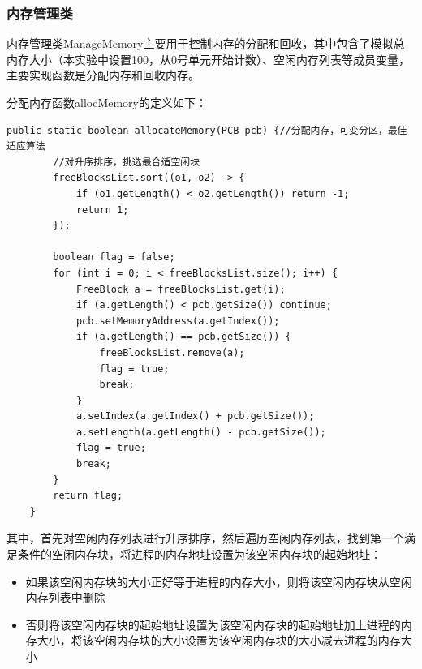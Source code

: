 \documentclass[UTF8,12pt]{article}
\begin{document}
\subsubsection{内存管理类}
内存管理类ManageMemory主要用于控制内存的分配和回收，其中包含了模拟总内存大小（本实验中设置100，从0号单元开始计数）、空闲内存列表等成员变量，主要实现函数是分配内存和回收内存。

分配内存函数allocMemory的定义如下：
\begin{lstlisting}[title=分配内存函数定义,frame=shadowbox]
    public static boolean allocateMemory(PCB pcb) {//分配内存，可变分区，最佳适应算法
        //对升序排序，挑选最合适空闲块
        freeBlocksList.sort((o1, o2) -> {
            if (o1.getLength() < o2.getLength()) return -1;
            return 1;
        });

        boolean flag = false;
        for (int i = 0; i < freeBlocksList.size(); i++) {
            FreeBlock a = freeBlocksList.get(i);
            if (a.getLength() < pcb.getSize()) continue;
            pcb.setMemoryAddress(a.getIndex());
            if (a.getLength() == pcb.getSize()) {
                freeBlocksList.remove(a);
                flag = true;
                break;
            }
            a.setIndex(a.getIndex() + pcb.getSize());
            a.setLength(a.getLength() - pcb.getSize());
            flag = true;
            break;
        }
        return flag;
    }
\end{lstlisting}

其中，首先对空闲内存列表进行升序排序，然后遍历空闲内存列表，找到第一个满足条件的空闲内存块，将进程的内存地址设置为该空闲内存块的起始地址：
\begin{itemize}
    \item 如果该空闲内存块的大小正好等于进程的内存大小，则将该空闲内存块从空闲内存列表中删除
    \item 否则将该空闲内存块的起始地址设置为该空闲内存块的起始地址加上进程的内存大小，将该空闲内存块的大小设置为该空闲内存块的大小减去进程的内存大小
\end{itemize}
\end{document}
